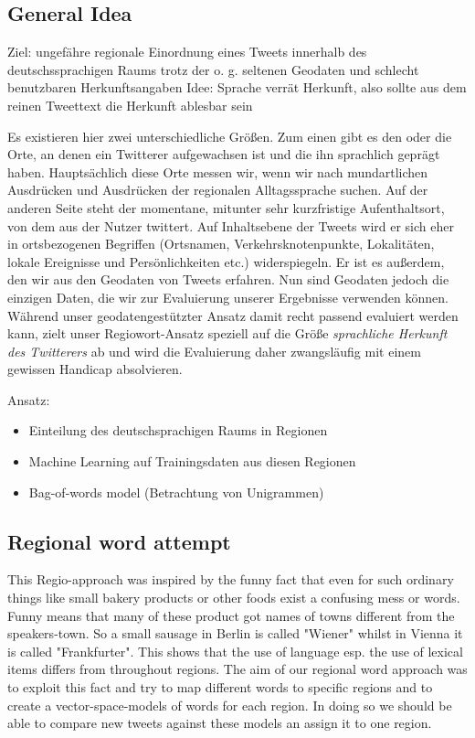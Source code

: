 \documentclass[../Main.tex]{subfiles}
\begin{document}
\subsection{General Idea}
Ziel: ungefähre regionale Einordnung eines Tweets innerhalb des deutschssprachigen Raums trotz der o. g. seltenen Geodaten und schlecht benutzbaren Herkunftsangaben %
Idee: Sprache verrät Herkunft, also sollte aus dem reinen Tweettext die Herkunft ablesbar sein %

Es existieren hier zwei unterschiedliche Größen. Zum einen gibt es den oder die Orte, an denen ein Twitterer aufgewachsen ist und die ihn sprachlich geprägt haben. Hauptsächlich diese Orte messen wir, wenn wir nach mundartlichen Ausdrücken und Ausdrücken der regionalen Alltagssprache suchen. Auf der anderen Seite steht der momentane, mitunter sehr kurzfristige Aufenthaltsort, von dem aus der Nutzer twittert. Auf Inhaltsebene der Tweets wird er sich eher in ortsbezogenen Begriffen (Ortsnamen, Verkehrsknotenpunkte, Lokalitäten, lokale Ereignisse und Persönlichkeiten etc.) widerspiegeln. Er ist es außerdem, den wir aus den Geodaten von Tweets erfahren. Nun sind Geodaten jedoch die einzigen Daten, die wir zur Evaluierung unserer Ergebnisse verwenden können. Während unser geodatengestützter Ansatz damit recht passend evaluiert werden kann, zielt unser Regiowort-Ansatz speziell auf die Größe \textit{sprachliche Herkunft des Twitterers} ab und wird die Evaluierung daher zwangsläufig mit einem gewissen Handicap absolvieren.

Ansatz:
\begin{itemize}
\item Einteilung des deutschsprachigen Raums in Regionen
\item Machine Learning auf Trainingsdaten aus diesen Regionen
\item Bag-of-words model (Betrachtung von Unigrammen)
\end{itemize}

\subsection{Regional word attempt}
This Regio-approach was inspired by the funny fact that even for such ordinary things like small bakery products or other foods exist a confusing mess or words. Funny means that many of these product got names of towns different from the speakers-town. So a small sausage in Berlin is called "Wiener" whilst in Vienna it is called "Frankfurter". This shows that the use of language esp. the use of lexical items differs from throughout regions. The aim of our regional word approach was to exploit this fact and try to map different words to specific regions and to create a vector-space-models of words for each region. In doing so we should be able to compare new tweets against these models an assign it to one region. 
\end{document}
